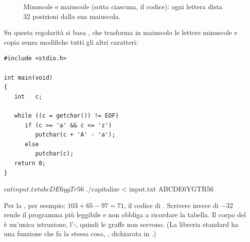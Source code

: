 \begin{figure}[H]
  \centering
  \caption{Minuscole e maiuscole (sotto ciascuna, il codice): ogni lettera
           dista 32 posizioni dalla sua maiuscola.}
  \label{fig:maiuscole}
\end{figure}

Su questa regolarità si basa , che trasforma in maiuscolo
le lettere minuscole e copia senza modifiche tutti gli altri caratteri:

\begin{affianco}[0.5][c]
\begin{lstlisting}[style=c, name=capitalize.c]
#include <stdio.h>

int main(void)
{
   int   c;

   while ((c = getchar()) != EOF)
      if (c >= 'a' && c <= 'z')
         putchar(c + 'A' - 'a');
      else
         putchar(c);
   return 0;
}
\end{lstlisting}
\risultato
\begin{console}
$ cat input.txt
abcDE6ygTr56
$ ./capitalize < input.txt
ABCDE6YGTR56
\end{console}
\end{affianco}

Per la , per esempio: $103 + 65 - 97 = 71$, il codice di
. Scrivere  invece di $-32$ rende il programma più
leggibile e non obbliga a ricordare la tabella. Il corpo del  è
un'unica istruzione, l'-, quindi le graffe non servono.
(La libreria standard ha una funzione che fa la stessa cosa, ,
dichiarata in .)


